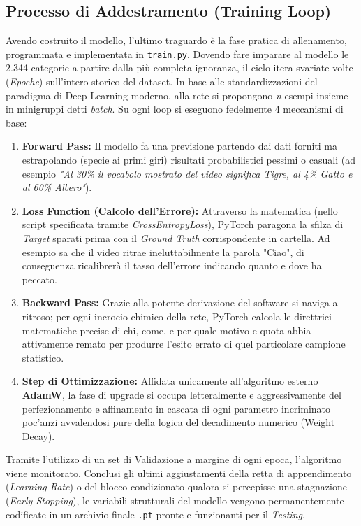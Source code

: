 \subsection{Processo di Addestramento (Training Loop)}
Avendo costruito il modello, l'ultimo traguardo è la fase pratica di allenamento, programmata e implementata in \texttt{train.py}.
Dovendo fare imparare al modello le 2.344 categorie a partire dalla più completa ignoranza, il ciclo itera svariate volte (\textit{Epoche}) sull'intero storico del dataset. In base alle standardizzazioni del paradigma di Deep Learning moderno, alla rete si propongono \textit{n} esempi insieme in minigruppi detti \textit{batch}. Su ogni loop si eseguono fedelmente 4 meccanismi di base:
\begin{enumerate}
    \item \textbf{Forward Pass:} Il modello fa una previsione partendo dai dati forniti ma estrapolando (specie ai primi giri) risultati probabilistici pessimi o casuali (ad esempio \textit{"Al 30\% il vocabolo mostrato del video significa Tigre, al 4\% Gatto e al 60\% Albero"}).
    \item \textbf{Loss Function (Calcolo dell'Errore):} Attraverso la matematica (nello script specificata tramite \textit{CrossEntropyLoss}), PyTorch paragona la sfilza di \textit{Target} sparati prima con il \textit{Ground Truth} corrispondente in cartella. Ad esempio sa che il video ritrae ineluttabilmente la parola "Ciao", di conseguenza ricalibrerà il tasso dell'errore indicando quanto e dove ha peccato.
    \item \textbf{Backward Pass:} Grazie alla potente derivazione del software si naviga a ritroso; per ogni incrocio chimico della rete, PyTorch calcola le direttrici matematiche precise di chi, come, e per quale motivo e quota abbia attivamente remato per produrre l'esito errato di quel particolare campione statistico.
    \item \textbf{Step di Ottimizzazione:} Affidata unicamente all'algoritmo esterno \textbf{AdamW}, la fase di upgrade si occupa letteralmente e aggressivamente del perfezionamento e affinamento in cascata di ogni parametro incriminato poc'anzi avvalendosi pure della logica del decadimento numerico (Weight Decay).
\end{enumerate}

Tramite l'utilizzo di un set di Validazione a margine di ogni epoca, l'algoritmo viene monitorato. Conclusi gli ultimi aggiustamenti della retta di apprendimento (\textit{Learning Rate}) o del blocco condizionato qualora si percepisse una stagnazione (\textit{Early Stopping}), le variabili strutturali del modello vengono permanentemente codificate in un archivio finale \texttt{.pt} pronte e funzionanti per il \textit{Testing}.
